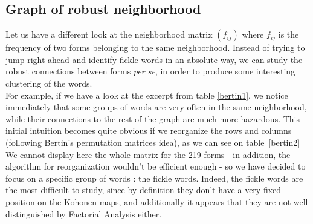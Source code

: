 \documentclass[preprint]{elsarticle}
\begin{document}
\subsection{Graph of robust neighborhood}

Let us have a different look at the neighborhood matrix $(f_{ij})$ where $f_{ij}$ is the frequency of two forms belonging to the same neighborhood. Instead of trying to jump right ahead and identify fickle words in an absolute way, we can study the robust connections between forms \textit{per se}, in order to produce some interesting clustering of the words.\\

For example, if we have a look at the excerpt from table \ref{bertin1}, we notice immediately that some groups of words are very often in the same neighborhood, while their connections to the rest of the graph are much more hazardous. This initial intuition becomes quite obvious if we reorganize the rows and columns (following Bertin's permutation matrices idea), as we can see on table~\ref{bertin2}\\

We cannot display here the whole matrix for the 219 forms - in addition, the algorithm for reorganization wouldn't be efficient enough - so we have decided to focus on a specific group of words : the fickle words. Indeed, the fickle words are the most difficult to study, since by definition they don't have a very fixed position on the Kohonen maps, and additionally it appears that they are not well distinguished by Factorial Analysis either.
\end{document}

